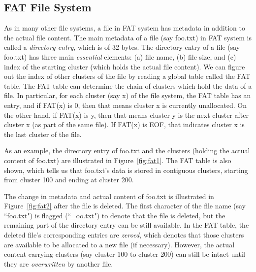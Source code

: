 \documentclass{ws-rv9x6}
\newenvironment{paraphrase}{\color{blue}}{\color{black}} %
\begin{document}
\subsection{FAT File System}
\begin{paraphrase}
 As in many other file systems, a file in FAT system has metadata in addition to the actual file content. 
The main metadata of a file (say foo.txt) in FAT system is called a \emph{directory entry}, which is of 32 bytes.
The directory entry of a file (say foo.txt) has three main \emph{essential} elements: (a) file name, (b) file size, and 
(c) index of the starting cluster (which holds the actual file content). We can figure 
out the index of other clusters of the file by reading a global table called the FAT table. The FAT table
can determine the chain of clusters which hold the data of a file. In particular, 
for each cluster (say x) of the file system, the FAT table has an entry, and 
if FAT(x) is 0, then that means cluster x is currently unallocated. 
On the other hand, if FAT(x) is y, then that means cluster y is the next cluster after cluster x (as part of the same file).
If FAT(x) is EOF, that indicates cluster x is the last cluster of the file.
   
As an example, the directory entry of foo.txt and the clusters (holding the actual content of foo.txt) 
are illustrated in Figure~\ref{fig:fat1}. The FAT table is also shown, which tells us that foo.txt's data is stored 
in contiguous clusters, starting from cluster 100 and ending at cluster 200.



The change in metadata and actual content of foo.txt is illustrated in Figure~\ref{fig:fat2} after the file is deleted.
The first character of the file name (say ``foo.txt") is flagged (``\_oo.txt") to denote that the file is deleted, 
but the remaining part of the directory entry can be still available. In the FAT table, the deleted file's corresponding
entries are \emph{zeroed}, which denotes that those clusters are available to be allocated to a new file (if necessary).
However, the actual content carrying clusters (say cluster 100 to cluster 200)
can still be intact until they are \emph{overwritten} by another file. 
  

\end{paraphrase}
\end{document}
